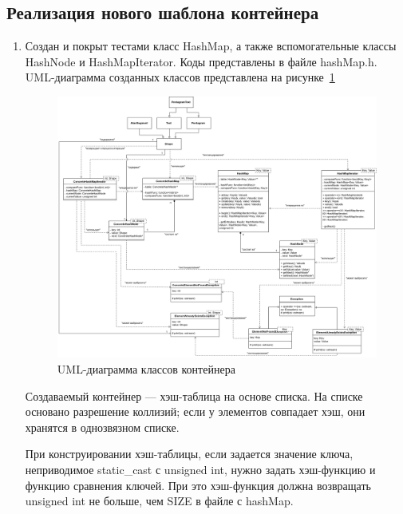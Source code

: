 \documentclass[a4paper, 14pt]{extarticle}
\begin{document}
\subsection{Реализация нового шаблона контейнера}
\begin{enumerate}
    \item Создан и покрыт тестами класс HashMap, а также вспомогательные классы HashNode и HashMapIterator. Коды представлены в файле hashMap.h.
    UML-диаграмма созданных классов представлена на рисунке~\ref{img:uml:container}
    \begin{figure}[h]
        \centering
        \includegraphics[width=0.85\textheight,angle=90]{./img/container_classes_uml.png}
        \caption{UML-диаграмма классов контейнера}%
        \label{img:uml:container}
    \end{figure}
    
    Создаваемый контейнер --- хэш-таблица на основе списка. На списке основано разрешение коллизий; если у элементов совпадает хэш, они хранятся в однозвязном списке.

    При конструировании хэш-таблицы, если задается значение ключа, неприводимое static\_cast с unsigned int, нужно задать хэш-функцию и функцию сравнения ключей. При это хэш-функция должна возвращать unsigned int не больше, чем SIZE в файле с hashMap.


\end{enumerate}
\end{document}
